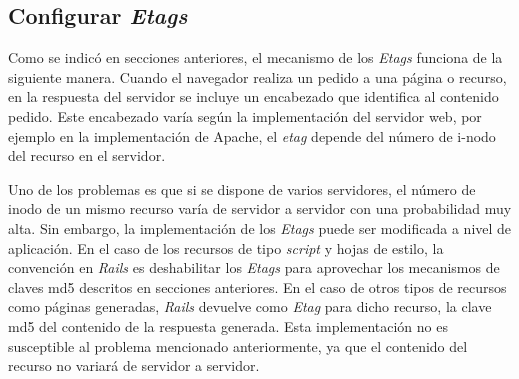 \subsection{Configurar \emph{Etags}}

Como se indicó en secciones anteriores, el mecanismo de los \emph{Etags} funciona de la siguiente manera. Cuando el navegador realiza un pedido a una página o recurso, en la
respuesta del servidor se incluye un encabezado que identifica al contenido pedido. Este encabezado varía según la implementación del servidor web, por ejemplo en la
implementación de Apache, el \emph{etag} depende del número de i-nodo del recurso en el servidor.

 Uno de los problemas es que si se dispone de varios servidores, el número de inodo de
un mismo recurso varía de servidor a servidor con una probabilidad muy alta. Sin embargo, la implementación de los \emph{Etags} puede ser modificada a nivel de aplicación.
En el caso de los recursos de tipo \emph{script} y hojas de estilo, la convención en \emph{Rails} es deshabilitar los \emph{Etags} para aprovechar los mecanismos de claves md5 
descritos en secciones anteriores. En el caso de otros tipos de recursos como páginas generadas, \emph{Rails} devuelve como \emph{Etag} para dicho recurso, la clave md5 del 
contenido de la respuesta generada. Esta implementación no es susceptible al problema mencionado anteriormente, ya que el contenido del recurso no variará de servidor a servidor.
